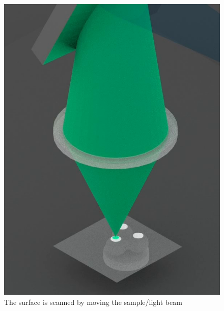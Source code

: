 \documentclass[t]{beamer}
\begin{document}
\begin{frame}
\begin{figure}
{     \includegraphics[scale=0.1]{CM-process-3-2}
     \caption{\footnotemark{}The surface is scanned by moving the sample/light beam}
     }
\end{figure}
\end{frame}
\end{document}
